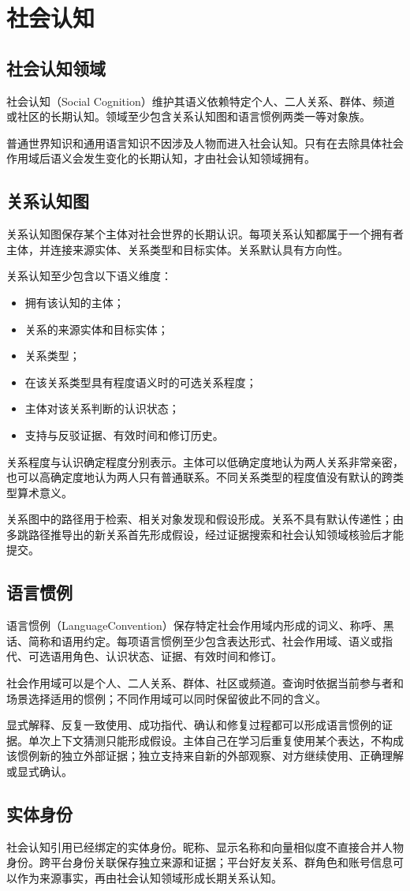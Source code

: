 \chapter{社会认知}

\section{社会认知领域}

社会认知（Social Cognition）维护其语义依赖特定个人、二人关系、群体、频道或社区的长期认知。领域至少包含关系认知图和语言惯例两类一等对象族。

普通世界知识和通用语言知识不因涉及人物而进入社会认知。只有在去除具体社会作用域后语义会发生变化的长期认知，才由社会认知领域拥有。

\section{关系认知图}

关系认知图保存某个主体对社会世界的长期认识。每项关系认知都属于一个拥有者主体，并连接来源实体、关系类型和目标实体。关系默认具有方向性。

关系认知至少包含以下语义维度：

\begin{itemize}
\item 拥有该认知的主体；
\item 关系的来源实体和目标实体；
\item 关系类型；
\item 在该关系类型具有程度语义时的可选关系程度；
\item 主体对该关系判断的认识状态；
\item 支持与反驳证据、有效时间和修订历史。
\end{itemize}

关系程度与认识确定程度分别表示。主体可以低确定度地认为两人关系非常亲密，也可以高确定度地认为两人只有普通联系。不同关系类型的程度值没有默认的跨类型算术意义。

关系图中的路径用于检索、相关对象发现和假设形成。关系不具有默认传递性；由多跳路径推导出的新关系首先形成假设，经过证据搜索和社会认知领域核验后才能提交。

\section{语言惯例}

语言惯例（LanguageConvention）保存特定社会作用域内形成的词义、称呼、黑话、简称和语用约定。每项语言惯例至少包含表达形式、社会作用域、语义或指代、可选语用角色、认识状态、证据、有效时间和修订。

社会作用域可以是个人、二人关系、群体、社区或频道。查询时依据当前参与者和场景选择适用的惯例；不同作用域可以同时保留彼此不同的含义。

显式解释、反复一致使用、成功指代、确认和修复过程都可以形成语言惯例的证据。单次上下文猜测只能形成假设。主体自己在学习后重复使用某个表达，不构成该惯例新的独立外部证据；独立支持来自新的外部观察、对方继续使用、正确理解或显式确认。

\section{实体身份}

社会认知引用已经绑定的实体身份。昵称、显示名称和向量相似度不直接合并人物身份。跨平台身份关联保存独立来源和证据；平台好友关系、群角色和账号信息可以作为来源事实，再由社会认知领域形成长期关系认知。

